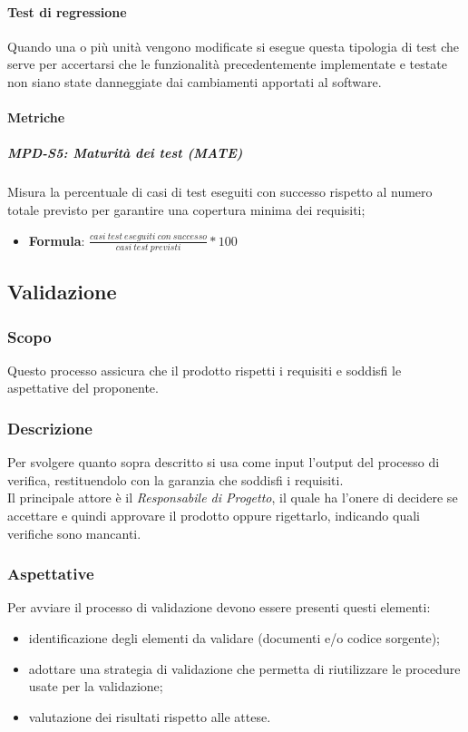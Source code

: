 \paragraph{Test di regressione}
Quando una o più unità vengono modificate si esegue questa tipologia di test che serve per accertarsi che le funzionalità precedentemente implementate e testate non siano state danneggiate dai cambiamenti apportati al software.

\paragraph{Metriche}
\subparagraph{MPD-S5: Maturità dei test (MATE)}
Misura la percentuale di casi di test eseguiti con successo rispetto al numero totale previsto per garantire una copertura minima dei requisiti;
\begin{itemize}
    \item \textbf{Formula}: \(\frac{casi\ test\ eseguiti\ con\ successo}{casi\ test\ previsti}*100\)
\end{itemize}

\subsection{Validazione}
\label{_validazione}
\subsubsection{Scopo}
Questo processo assicura che il prodotto rispetti i requisiti e soddisfi le aspettative del proponente.

\subsubsection{Descrizione}
Per svolgere quanto sopra descritto si  usa come input l'output del processo di verifica,
restituendolo con la garanzia che soddisfi i requisiti.\\
Il principale attore è il \textit{Responsabile di Progetto}, il quale ha l'onere di decidere
se accettare e quindi approvare il prodotto oppure rigettarlo, indicando quali verifiche sono mancanti.

\subsubsection{Aspettative}
Per avviare il processo di validazione devono essere presenti questi elementi:
\begin{itemize}
    \item identificazione degli elementi da validare (documenti e/o codice sorgente);
    \item adottare una strategia di validazione che permetta di riutilizzare le procedure usate
          per la validazione;
    \item valutazione dei risultati rispetto alle attese.
\end{itemize}

